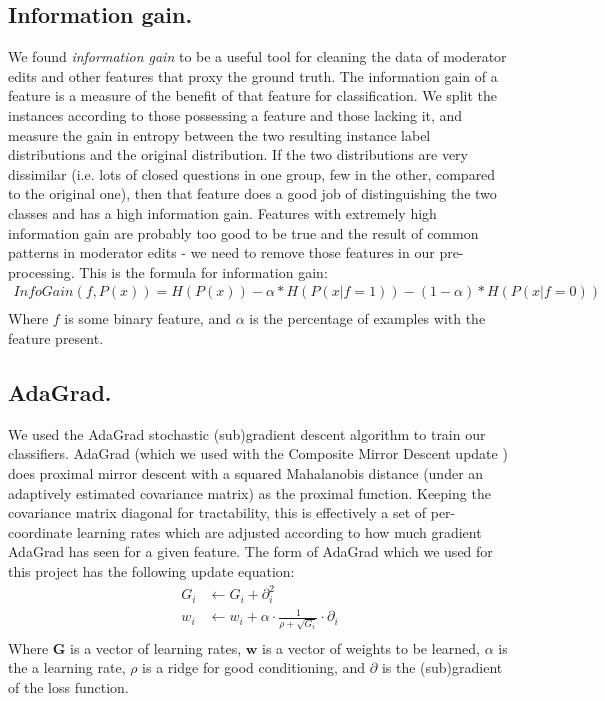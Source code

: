 \documentclass[11pt]{article}
\begin{document}
\subsection*{Information gain.}We found \emph{information gain} \cite{wiki:infogain} to be a useful tool for cleaning the data of moderator edits and other features that proxy the ground truth. The information gain of a feature is a measure of the benefit of that feature for classification. We split the instances according to those possessing a feature and those lacking it, and measure the gain in entropy between the two resulting instance label distributions and the original distribution. If the two distributions are very dissimilar (i.e. lots of closed questions in one group, few in the other, compared to the original one), then that feature does a good job of distinguishing the two classes and has a high information gain. Features with extremely high information gain are probably too good to be true and the result of common patterns in moderator edits - we need to remove those features in our pre-processing. This is the formula for information gain:
\begin{equation*}
\begin{split}
InfoGain(f, P(x)) = H(P(x)) - \alpha*H(P(x|f=1)) - (1 - \alpha)*H(P(x|f=0))\\
\end{split}
\end{equation*}
Where $f$ is some binary feature, and $\alpha$ is the percentage of examples with the feature present.

\subsection*{AdaGrad.}We used the AdaGrad \cite{duchi:11a} stochastic (sub)gradient descent algorithm to train our classifiers. AdaGrad (which we used with the Composite Mirror Descent update \cite{duchi:10a}) does proximal mirror descent with a squared Mahalanobis distance (under an adaptively estimated covariance matrix) as the proximal function. Keeping the covariance matrix diagonal for tractability, this is effectively a set of per-coordinate learning rates which are adjusted according to how much gradient AdaGrad has seen for a given feature. The form of AdaGrad which we used for this project has the following update equation:
\begin{equation*}
\begin{split}
G_i &\leftarrow G_i + \partial_i^2\\
w_i &\leftarrow w_i + \alpha \cdot \frac{1}{\rho + \sqrt{G_i}} \cdot \partial_i\\
\end{split}
\end{equation*}
Where $\textbf{G}$ is a vector of learning rates, $\textbf{w}$ is a vector of weights to be learned, $\alpha$ is the a learning rate, $\rho$ is a ridge for good conditioning, and $\partial$ is the (sub)gradient of the loss function.
\end{document}
